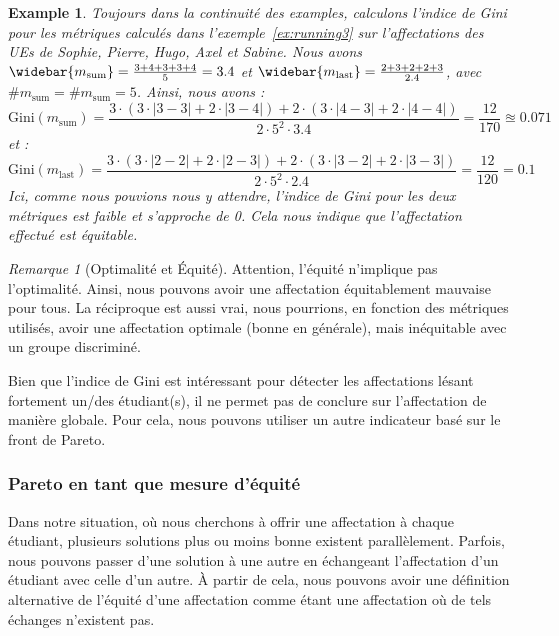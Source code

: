 \documentclass{rapport}
\theoremstyle{definition}
\theoremstyle{remark}
\theoremstyle{plain}
\newtheorem{example}{Example}
\theoremstyle{definition}
\theoremstyle{remark}
\newtheorem{remark}{Remarque}
\begin{document}
\begin{example}\label{ex:running5}
    Toujours dans la continuité des examples, calculons l'indice de Gini pour les métriques calculés dans l'exemple~\ref{ex:running3} sur l'affectations des UEs de Sophie, Pierre, Hugo, Axel et Sabine.
    Nous avons $\widebar{m_\text{sum}} = \frac{3+4+3+3+4}{5}=3.4$ et $\widebar{m_\text{last}} = \frac{2+3+2+2+3}{2.4}$, avec $\#m_{\text{sum}} = \#m_{\text{sum}} = 5$.
    Ainsi, nous avons :
    $$
    \text{Gini}(m_{\text{sum}}) = \frac{3\cdot\left(3\cdot|3-3|+2\cdot|3-4|\right)+2\cdot\left(3\cdot|4-3|+2\cdot|4-4|\right)}{2\cdot5^2\cdot3.4} = \frac{12}{170} \approxeq 0.071
    $$
    et :
    $$
    \text{Gini}(m_{\text{last}}) = \frac{3\cdot\left(3\cdot|2-2|+2\cdot|2-3|\right)+2\cdot\left(3\cdot|3-2|+2\cdot|3-3|\right)}{2\cdot5^2\cdot2.4} = \frac{12}{120} = 0.1
    $$
    Ici, comme nous pouvions nous y attendre, l'indice de Gini pour les deux métriques est faible et s'approche de 0. Cela nous indique que l'affectation effectué est équitable.
\end{example}

\begin{remark}[Optimalité et Équité]
    Attention, l'équité n'implique pas l'optimalité. Ainsi, nous pouvons avoir une affectation équitablement mauvaise pour tous.
    La réciproque est aussi vrai, nous pourrions, en fonction des métriques utilisés, avoir une affectation optimale (bonne en générale), mais inéquitable avec un groupe discriminé.
\end{remark}

Bien que l'indice de Gini est intéressant pour détecter les affectations lésant fortement un/des étudiant(s), il ne permet pas de conclure sur l'affectation de manière globale.
Pour cela, nous pouvons utiliser un autre indicateur basé sur le front de Pareto.

\subsubsection{Pareto en tant que mesure d'équité}
Dans notre situation, où nous cherchons à offrir une affectation à chaque étudiant, plusieurs solutions plus ou moins bonne existent parallèlement.
Parfois, nous pouvons passer d'une solution à une autre en échangeant l'affectation d'un étudiant avec celle d'un autre.
À partir de cela, nous pouvons avoir une définition alternative de l'équité d'une affectation comme étant une affectation où de tels échanges n'existent pas.
\end{document}
